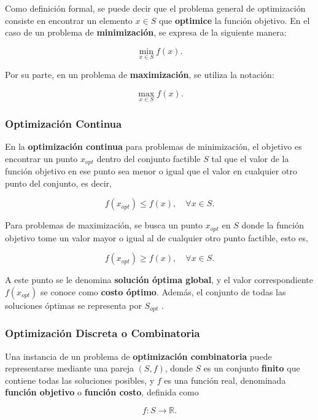 \documentclass[12pt,titlepage,twoside,openright]{book}
\begin{document}
Como definición formal, se puede decir que el problema general de optimización consiste en encontrar un elemento \(x \in S\) que \textbf{optimice} la función objetivo. En el caso de un problema de \textbf{minimización}, se expresa de la siguiente manera:

\[
	\min_{x \in S} f(x).
\]

Por su parte, en un problema de \textbf{maximización}, se utiliza la notación:

\[
	\max_{x \in S} f(x).
\]

\citep{cobos2010}



\subsubsection{Optimización Continua}

En la \textbf{optimización continua} para problemas de minimización, el objetivo es encontrar un punto \( x_{opt} \) dentro del conjunto factible \( S \) tal que el valor de la función objetivo en ese punto sea menor o igual que el valor en cualquier otro punto del conjunto, es decir,

\[
	f(x_{opt}) \leq f(x), \quad \forall x \in S.
\]

Para problemas de maximización, se busca un punto \( x_{opt} \) en \( S \) donde la función objetivo tome un valor mayor o igual al de cualquier otro punto factible, esto es,

\[
	f(x_{opt}) \geq f(x), \quad \forall x \in S.
\]

A este punto se le denomina \textbf{solución óptima global}, y el valor correspondiente \( f(x_{opt}) \) se conoce como \textbf{costo óptimo}. Además, el conjunto de todas las soluciones óptimas se representa por \( S_{opt} \) \citep{cobos2010}.


\subsubsection{Optimización Discreta o Combinatoria}
\label{subsec:opt_discreta}

Una instancia de un problema de \textbf{optimización combinatoria} puede representarse mediante una pareja \((S, f)\), donde \(S\) es un conjunto \textbf{finito} que contiene todas las soluciones posibles, y \(f\) es una función real, denominada \textbf{función objetivo} o \textbf{función costo}, definida como

\[
	f: S \to \mathbb{R}.
\]
\end{document}
